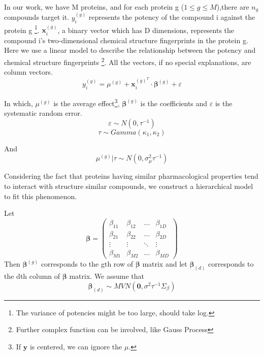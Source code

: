 \documentclass[paper=a4, fontsize=11pt]{scrartcl}
\numberwithin{equation}{section}		%
\numberwithin{figure}{section}			%
\numberwithin{table}{section}				%
\begin{document}
In our work, we have M proteins, and for each protein g ($1\leq g\leq M$),there are $n_g$ compounds target it. $y_{i}^{(g)}$ represents the potency of the compound i against the protein g \footnote{The variance of potencies might be too large, should take log.}. $\textbf{x}_{i}^{(g)}$, a binary vector which has D dimensions, represents the compound i's two-dimensional chemical structure fingerprints in the protein g. Here we use a linear model to describe the relationship between the potency and chemical structure fingerprints \footnote{Further complex function can be involved, like Gauss Process}. All the vectors, if no special explanations, are column vectors.
\begin{equation}
  y_{i}^{(g)} = \mu^{(g)} + \textbf{x}_{i}^{(g)^{T}}\cdot \bm{\beta}^{(g)} + \varepsilon
\end{equation}

In which, $\mu^{(g)}$ is the average effect\footnote{If $\bm{y}$ is centered, we can ignore the $\mu$.}, $\bm{\beta}^{(g)}$ is the coefficients and $\varepsilon$ is the systematic random error.
\begin{equation}
\varepsilon \sim N(0,\tau^{-1})
\end{equation}
\begin{equation}
\tau \sim Gamma(\kappa_{1},\kappa_{2})
\end{equation}

And
\begin{equation}
  \mu^{(g)}|\tau \sim N(0,\sigma_{\mu}^2\tau^{-1})
\end{equation}

Considering the fact that proteins having similar pharmacological properties tend to interact with structure similar compounds, we construct a hierarchical model to fit this phenomenon.

Let
\begin{displaymath}
\bm{\beta} =
\left( \begin{array}{cccc}
\beta_{11} & \beta_{12} & \ldots & \beta_{1D}\\
\beta_{21} & \beta_{22} & \ldots & \beta_{2D}\\
\vdots & \vdots & \ddots & \vdots \\
\beta_{M1} & \beta_{M2} & \ldots & \beta_{MD}
\end{array}
\right)
\end{displaymath}
Then $\bm{\beta}^{(g)}$ corresponds to the gth row of $\bm{\beta}$ matrix and let $\bm{\beta}_{(d)}$ corresponds to the dth column of $\bm{\beta}$ matrix.
We assume that
\begin{equation}
  \bm{\beta}_{(d)} \sim MVN\left(\bm{0},\sigma^{2}\tau^{-1}\Sigma_{\beta}\right)
\end{equation}
\end{document}
